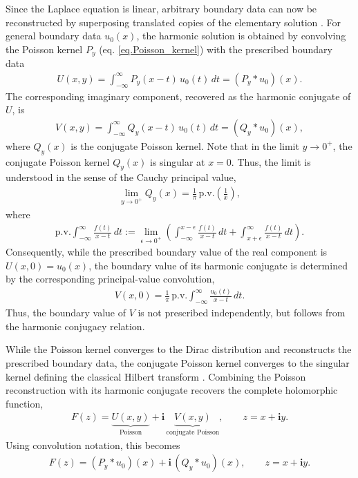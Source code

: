 \documentclass[11pt]{article}
\newcommand{\imag}{\textbf{i}}
\begin{document}
	Since the Laplace equation is linear, arbitrary boundary data can now be reconstructed by superposing translated copies of the elementary solution \citep{axler2001harmonic}. For general boundary data $u_0(x)$, the harmonic solution is obtained by convolving the Poisson kernel $P_y$ (eq. \eqref{eq.Poisson_kernel}) with the prescribed boundary data  
		\begin{align}
			U(x,y)
			=
			\int_{-\infty}^{\infty}
			P_y(x-t)\,u_0(t)\,dt
			=
			(P_y*u_0)(x).
			\label{eq.Convolution_real}
		\end{align}
	The corresponding imaginary component, recovered as the harmonic conjugate of $U$, is 
	\begin{align}
		V(x,y)
		=
		\int_{-\infty}^{\infty}
		Q_y(x-t)\,u_0(t)\,dt
		=
		(Q_y*u_0)(x),
	\end{align}
	where $	Q_y(x)$ is the conjugate Poisson kernel. Note that in the limit \(y\to0^+\), the conjugate Poisson kernel
	\(Q_y(x)\) is singular at \(x=0\). Thus, the limit is understood
	in the sense of the Cauchy principal value,
	\begin{align}
		\lim_{y\to0^+}Q_y(x)
		=
		\frac{1}{\pi}\,
		\mathrm{p.v.}\!\left(\frac{1}{x}\right) ,
	\end{align}
	where
	\begin{align*}
		\mathrm{p.v.}\!\int_{-\infty}^{\infty}\frac{f(t)}{x-t}\,dt
		:=
		\lim_{\epsilon\to0^+}
		\left(
		\int_{-\infty}^{x-\epsilon}
		\frac{f(t)}{x-t}\,dt
		+
		\int_{x+\epsilon}^{\infty}
		\frac{f(t)}{x-t}\,dt
		\right).
	\end{align*}
	Consequently, while the prescribed boundary value of the real component is $U(x,0)=u_0(x)$, the boundary value of its harmonic conjugate is determined by the corresponding principal-value convolution,
	\begin{align}
		V(x,0)
		=
		\frac{1}{\pi}\,
		\mathrm{p.v.}\!\int_{-\infty}^{\infty}
		\frac{u_0(t)}{x-t}\,dt.
	\end{align}
	Thus, the boundary value of \(V\) is not prescribed independently,
	but follows from the harmonic conjugacy relation.
	
	While the Poisson kernel converges to the Dirac distribution and reconstructs the prescribed boundary data, the conjugate Poisson kernel converges to the singular kernel defining the classical Hilbert transform \citep{axler2001harmonic}. Combining the Poisson reconstruction with its harmonic conjugate recovers
	the complete holomorphic function,
	\begin{align}
		F(z)
		=
		\underbrace{U(x,y)}_{\text{Poisson}}
		+
		\imag\,
		\underbrace{V(x,y)}_{\text{conjugate Poisson}},
		\qquad z=x+\imag y.
		\label{eq.Cauchy_Hilbert_Poisson_General_boundary}
	\end{align}
	Using convolution notation, this becomes
	\begin{align}
		F(z)
		=
		(P_y*u_0)(x)
		+
		\imag\,(Q_y*u_0)(x),
		\qquad z=x+\imag y.
		\label{eq.Integral_Cauchy_Hilbert_Poisson}
	\end{align}
	
\end{document}
